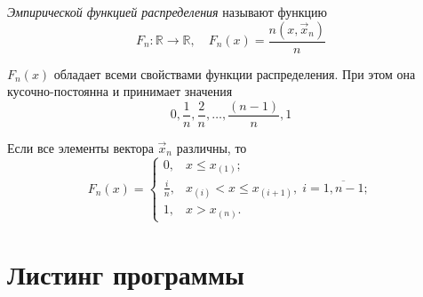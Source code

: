 \begin{defn}
	\emph{Эмпирической функцией распределения} называют функцию
	\begin{equation}
	F_n\colon \mathbb{R} \to \mathbb{R}, \quad F_n(x) = \frac{n(x, \vec{x}_n)}{n}
	\end{equation}
\end{defn}
\begin{rem}
	$F_n(x)$ обладает всеми свойствами функции распределения. При этом она кусочно-постоянна и принимает значения 
	\[
	0, \frac{1}{n}, \frac{2}{n}, \ldots, \frac{(n-1)}{n}, 1
	\]
\end{rem}
\begin{rem}
	Если все элементы вектора $\vec{x}_n$ различны, то
	\begin{equation}
	F_n(x) = 
	\begin{cases}
	0, & x \leq x_{(1)}; \\
	\frac{i}{n}, & x_{(i)} < x \leq x_{(i+1)},\; i = \overline{1, n-1}; \\
	1, & x > x_{(n)}.
	\end{cases}
	\end{equation}
\end{rem}

\section*{Листинг программы}

